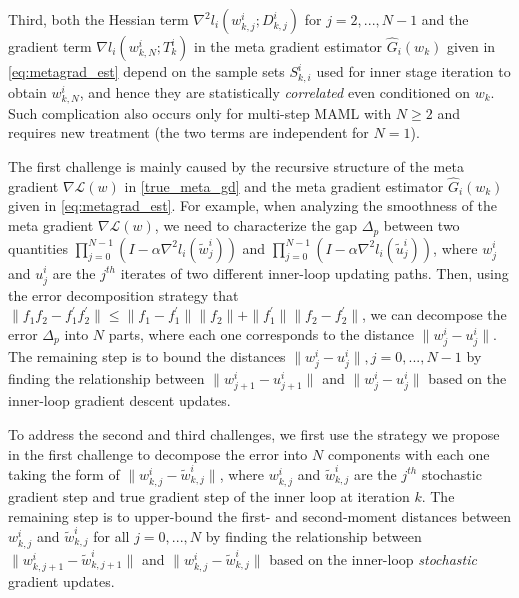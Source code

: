 \documentclass{osudissert96}
\begin{document}
Third, both the Hessian term {\small$\nabla^2 l_i(w_{k,j}^i; D_{k,j}^i)$} for $j=2,...,N-1$ and the gradient term {\small$\nabla l_i(w_{k,N}^i; T^i_k)$} in the meta gradient estimator {\small$\widehat G_i(w_k)$} given in \cref{eq:metagrad_est} depend on the sample sets  $S_{k,i}^i$ used for inner stage iteration to obtain $w_{k,N}^i$, and hence they are statistically {\em correlated} even conditioned on $w_k$. Such complication also occurs only for multi-step MAML with $N\geq 2$ and requires new treatment (the two terms are independent for $N=1$).



\vspace{0.2cm}
 The first challenge is mainly caused by the recursive structure of the meta gradient $\nabla \mathcal{L}(w)$ in \cref{true_meta_gd} and the meta gradient estimator {\small$\widehat G_i(w_k)$}  given in \cref{eq:metagrad_est}. For example, when analyzing the smoothness of the meta gradient $\nabla \mathcal{L}(w)$, we  need to characterize the gap $\Delta_p$ between two quantities $\prod_{j=0}^{N-1}(I-\alpha \nabla^2 l_i(\widetilde w^i_{j}))$ and $\prod_{j=0}^{N-1}(I-\alpha \nabla^2 l_i(\widetilde u^i_{j}))$, where $w_j^i$ and $u_j^i$ are the $j^{th}$ iterates of two different inner-loop updating paths. Then, using the error decomposition strategy that $\|f_1f_2-f_1^\prime f_2^\prime\|\leq\|f_1-f_1^\prime\|\|f_2\| + \|f_1^\prime\|\|f_2-f_2^\prime\|$, we can decompose the error $\Delta_p$ into $N$ parts, where each one corresponds to the distance $\|w^i_{j}-u^i_{j}\|$. The remaining step is to bound the distances $\|w^i_{j}-u^i_{j}\|, j=0,...,N-1$ by finding the relationship between $\|w^i_{j+1}-u^i_{j+1}\|$ and $\|w^i_{j}-u^i_{j}\|$
based on the inner-loop gradient descent updates. 
\vspace{0.01cm}

To address the second and third challenges, we first use the strategy we propose in the first challenge to decompose the error into $N$ components with each one taking the form of $\|w_{k,j}^i-\widetilde w_{k,j}^i\|$, where $w_{k,j}^i$ and $\widetilde w_{k,j}^i$ are the $j^{th}$ stochastic gradient step and true gradient step
of the inner loop at iteration $k$.  The remaining step is to upper-bound the first- and second-moment distances between $w_{k,j}^i$ and $\widetilde w_{k,j}^i$ for all { $j= 0,..., N$}  by finding the relationship between $\|w_{k,j+1}^i-\widetilde w_{k,j+1}^i\|$ and $\|w_{k,j}^i-\widetilde w_{k,j}^i\|$
based on the inner-loop {\em stochastic} gradient updates.
\end{document}
